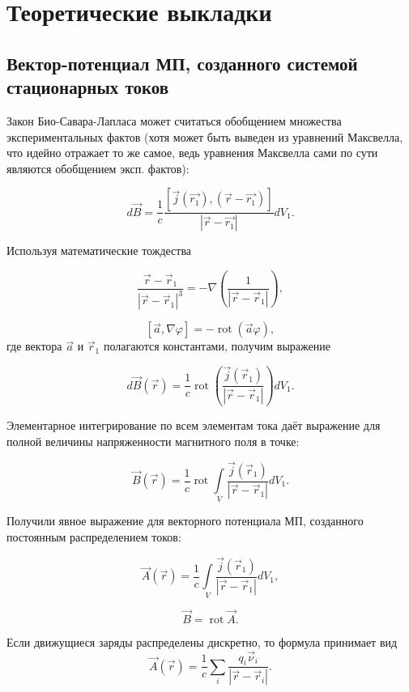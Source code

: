 \documentclass[a4paper, 12pt]{article}
\begin{document}


\section*{Теоретические выкладки}
\subsection*{Вектор-потенциал МП, созданного системой стационарных токов}
{
Закон Био-Савара-Лапласа может считаться обобщением множества экспериментальных фактов (хотя может быть выведен из уравнений Максвелла, что идейно отражает то же самое, ведь уравнения Максвелла сами по сути являются обобщением эксп. фактов):

$$ d\vec B=\frac{1}{c}\frac{[\vec j(\vec{r_1}), (\vec{r}-\vec{r_1})]}{|\vec{r} - \vec{r_1}|} dV_1.$$

Используя математические тождества 

$$ \frac{\vec r - \vec r_1}{|\vec r - \vec r_1|^3}=-\nabla\left(\frac{1}{|\vec r - \vec r_1|}\right),$$

$$[\vec a, \nabla \varphi]=-\operatorname{rot}(\vec a \varphi),$$
где вектора $\vec a$ и $\vec r_1$ полагаются константами, получим выражение

$$d \vec B(\vec r) = \frac{1}{c}\operatorname{rot}\left(\frac{\vec j (\vec r_1)}{| \vec r - \vec r_1 |} \right) d V_1.$$

Элементарное интегрирование по всем элементам тока даёт выражение для полной величины напряженности магнитного поля в точке:

$$ \vec B(\vec r) = \frac{1}{c}\operatorname{rot}\int\limits_{V} \frac{\vec j (\vec r_1)}{| \vec r - \vec r_1 |}  d V_1.$$

Получили явное выражение для векторного потенциала МП, созданного постоянным распределением токов:

$$ \vec A (\vec r) = \frac{1}{c}\int\limits_{V} \frac{\vec j (\vec r_1)}{| \vec r - \vec r_1 |}  d V_1,$$

\begin{equation}
\label{b=rota}
\vec B = \operatorname{rot} \vec A.
\end{equation}

Если движущиеся заряды распределены дискретно, то формула принимает вид
$$ \vec A (\vec r) = \frac{1}{c}\sum\limits_{i} \frac{q_i \vec \nu_i}{| \vec r - \vec r_i |} .$$

}
\end{document}
